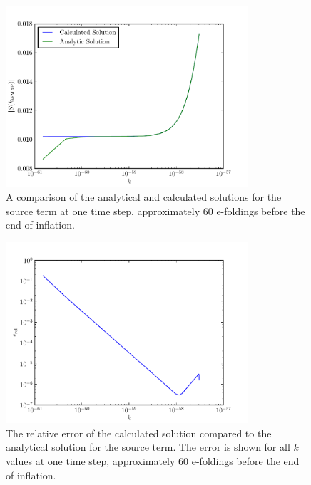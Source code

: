 \begin{figure}
 \centering
 \includegraphics[width=0.8\textwidth]{numerical/graphs/analytic_v_calced_61beforeend-large}
 \caption[Comparison of Analytical and Calculated Source Terms]{A comparison of the
analytical and calculated solutions for the source term at one time step, approximately 60
e-foldings before the end of inflation.}
 \label{fig:analytic-61before-res}
\end{figure}

\begin{figure}
 \centering
 \includegraphics[width=0.8\textwidth]{numerical/graphs/analytic_v_calced_61beforeend_errors-large}
 \caption[Relative Error Of Calculated Solution at One Time Step]{The relative error of the
calculated solution compared to the analytical solution for the source term. The error is shown
for all $k$ values at one time step, approximately 60 e-foldings before the end of inflation.}
 \label{fig:analytic-61before-errors-res}
\end{figure}

